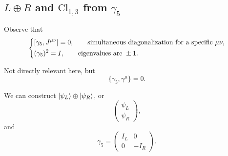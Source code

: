 \subsection{\texorpdfstring{$L \oplus R$ and $\mathrm{Cl}_{1,3}$ from $\gamma_5$}{L + R and Cl(1,3) from gamma5}}
Observe that
\begin{equation}
    \begin{dcases}
        [\gamma_5, J^{\mu \nu}] = 0, \qquad \text{simultaneous diagonalization for a specific } \mu \nu, \\
        (\gamma_5)^2 = I, \qquad \text{eigenvalues are } \pm 1.
    \end{dcases}
\end{equation}
\begin{framed}
    Not directly relevant here, but
    \begin{equation}
        \{\gamma_5, \gamma^\mu\} = 0.
    \end{equation}
\end{framed}
We can construct $\ket{\psi_L} \oplus \ket{\psi_R}$, or
\begin{equation}
    \begin{pmatrix}
        \psi_L \\
        \psi_R
    \end{pmatrix},
\end{equation}
and
\begin{equation}
    \gamma_5 = \begin{pmatrix}
        I_L & 0 \\
        0 & - I_R
    \end{pmatrix}.
\end{equation}
